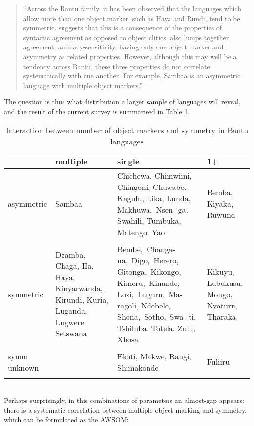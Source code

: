 \documentclass[output=paper
,modfonts
,nonflat]{langsci/langscibook}
\begin{document}
\begin{quote}
	“Across the Bantu family, it has been observed that the languages which allow more than one object marker, such as Haya and Rundi, tend to be symmetric. \citet{Baker2008a} suggests that this is a consequence of the properties of syntactic agreement as opposed to object clitics. \citet{Bentley1994} also lumps together agreement, animacy-sensitivity, having only one object marker and asymmetry as related properties. However, although this may well be a tendency across Bantu, these three properties do not correlate systematically with one another. For example, Sambaa is an asymmetric language with multiple object markers.” \citep[78]{Riedel2009}
\end{quote}
The question is thus what distribution a larger sample of languages will reveal, and the result of the current survey is summarised in Table \ref{Table 3}.
\begin{table}
\caption{Interaction between number of object markers and symmetry in Bantu languages} 
\label{Table 3}
\begin{tabularx}{\textwidth}{XXXX}
	\lsptoprule
	& multiple & single & 1+\\
	\midrule
	asymmetric & Sambaa & Chichewa, Chimwiini, Chingoni, Chuwabo, Kagulu, Lika, Lunda, \mbox{Makhuwa, Nsen-} ga, Swahili, Tumbuka, Matengo, Yao & Bemba, Kiyaka, Ruwund\\ \\
	\midrule
	symmetric & Dzamba, Chaga, Ha, Haya, Kinyarwanda, Kirundi, Kuria, Luganda, Lugwere, Setswana & \mbox{Bembe, Changa-} \mbox{na, Digo, Herero}, \mbox{Gitonga, Kikongo,} \mbox{Kimeru, Kinande,} \mbox{Lozi, Luguru, Ma-} ragoli, Ndebele, \mbox{Shona, Sotho, Swa-} ti, Tshiluba, Totela, Zulu, Xhosa & Kikuyu, Lubukusu, Mongo, Nyaturu, Tharaka\\ \\
	\midrule
	symm unknown &  & Ekoti, Makwe, Rangi, Shimakonde & Fuliiru\\
	\lspbottomrule
\end{tabularx}
\end{table} \\ \noindent
Perhaps surprisingly, in this combinations of parameters an almost-gap appears: there is a systematic correlation between multiple object marking and symmetry, which can be formulated as the AWSOM:
\end{document}
